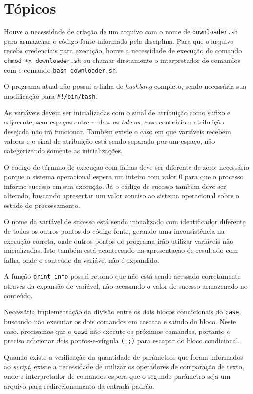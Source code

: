 \documentclass{article}
\begin{document}
\section{Tópicos}

Houve a necessidade de criação de um arquivo com o nome de
\texttt{downloader.sh} para armazenar o código-fonte informado pela disciplina.
Para que o arquivo receba credenciais para execução, houve a necessidade de
execução do comando \texttt{chmod +x downloader.sh} ou chamar diretamente o
interpretador de comandos com o comando \texttt{bash downloader.sh}.

O programa atual não possui a linha de \textit{hashbang} completo, sendo
necessária sua modificação para \texttt{\#!/bin/bash}.

As variáveis devem ser inicializadas com o sinal de atribuição como sufixo e
adjacente, sem espaços entre ambos os \textit{tokens}, caso contrário a
atribuição desejada não irá funcionar. Também existe o caso em que variáveis
recebem valores e o sinal de atribuição está sendo separado por um espaço, não
categorizando somente as inicializações.

O código de término de execução com falhas deve ser diferente de zero;
necessário porque o sistema operacional espera um inteiro com valor 0 para que o
processo informe sucesso em sua execução. Já o código de sucesso também deve ser
alterado, buscando apresentar um valor conciso ao sistema operacional sobre o
estado do processamento.

O nome da variável de sucesso está sendo inicializado com identificador
diferente de todos os outros pontos do código-fonte, gerando uma inconsistência
na execução correta, onde outros pontos do programa irão utilizar variáveis não
inicializadas. Isto também está acontecendo na apresentação de resultado com
falha, onde o conteúdo da variável não é expandido.

A função \texttt{print\_info} possui retorno que não está sendo acessado
corretamente através da expansão de variável, não acessando o valor de sucesso
armazenado no conteúdo.

Necessária implementação da divisão entre os dois blocos condicionais do
\texttt{case}, buscando não executar os dois comandos em cascata e saindo do
bloco. Neste caso, precisamos que o \texttt{case} não execute os próximos
comandos, portanto é preciso adicionar dois pontos-e-vírgula \texttt{(;;)}
para escapar do bloco condicional.

Quando existe a verificação da quantidade de parâmetros que foram informados ao
\textit{script}, existe a necessidade de utilizar os operadores de comparação de
texto, onde o interpretador de comandos espera que o segundo parâmetro seja um
arquivo para redirecionamento da entrada padrão.
\end{document}
